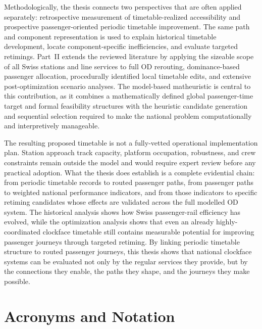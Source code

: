 \documentclass[preprint,12pt]{elsarticle}
\providecommand{\theHpage}{\thepage}
\begin{document}
Methodologically, the thesis connects two perspectives that are often applied separately: retrospective measurement of timetable-realized accessibility and prospective passenger-oriented periodic timetable improvement. The same path and component representation is used to explain historical timetable development, locate component-specific inefficiencies, and evaluate targeted retimings. Part~II extends the reviewed literature by applying the sizeable scope of all Swiss stations and line services to full OD rerouting, dominance-based passenger allocation, procedurally identified local timetable edits, and extensive post-optimization scenario analyses. The model-based matheuristic is central to this contribution, as it combines a mathematically defined global passenger-time target and formal feasibility structures with the heuristic candidate generation and sequential selection required to make the national problem computationally and interpretively manageable.

The resulting proposed timetable is not a fully-vetted operational implementation plan. Station approach track capacity, platform occupation, robustness, and crew constraints remain outside the model and would require expert review before any practical adoption. What the thesis does establish is a complete evidential chain: from periodic timetable records to routed passenger paths, from passenger paths to weighted national performance indicators, and from those indicators to specific retiming candidates whose effects are validated across the full modelled OD system. The historical analysis shows how Swiss passenger-rail efficiency has evolved, while the optimization analysis shows that even an already highly-coordinated clockface timetable still contains measurable potential for improving passenger journeys through targeted retiming. By linking periodic timetable structure to routed passenger journeys, this thesis shows that national clockface systems can be evaluated not only by the regular services they provide, but by the connections they enable, the paths they shape, and the journeys they make possible.


\clearpage
\setcounter{page}{1}
\renewcommand{\thepage}{A\arabic{page}}
\renewcommand{\theHpage}{A\arabic{page}}
\section*{Acronyms and Notation}
\label{sec:acronyms-notation}
\end{document}
